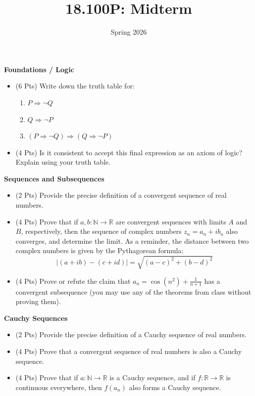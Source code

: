 \documentclass{article}
\title{18.100P: Midterm}
\date{Spring 2026}
\begin{document}
    \maketitle
    \textbf{Foundations / Logic}
    \begin{itemize}
        \item (6 Pts)
            Write down the truth table for:
            \begin{enumerate}
                \item
                    $P\Rightarrow\neg{Q}$
                \item
                    $Q\Rightarrow\neg{P}$
                \item
                    $(P\Rightarrow\neg{Q})\Rightarrow(Q\Rightarrow\neg{P})$
            \end{enumerate}
        \item (4 Pts)
            Is it consistent to accept this final expression
            as an axiom of logic? Explain using your truth table.
    \end{itemize}
    \newpage
    \textbf{Sequences and Subsequences}
    \begin{itemize}
        \item
            (2 Pts)
            Provide the precise definition of a convergent sequence of real
            numbers.
        \item
            (4 Pts)
            Prove that if $a,b:\mathbb{N}\rightarrow\mathbb{R}$ are
            convergent sequences with limits $A$ and $B$, respectively,
            then the sequence of complex numbers
            $z_{n}=a_{n}+ib_{n}$ also converges, and determine the limit.
            As a reminder, the distance between two complex numbers is given
            by the Pythagorean formula:
            \begin{equation}
                |(a+ib)-(c+id)|
                =
                \sqrt{(a-c)^{2}+(b-d)^{2}}
            \end{equation}
        \item
            (4 Pts)
            Prove or refute the claim that
            $a_{n}=\cos(n^{2})+\frac{1}{n+1}$ has a convergent subsequence
            (you may use any of the theorems from class without proving them).
    \end{itemize}
    \newpage
    \textbf{Cauchy Sequences}
    \begin{itemize}
        \item
            (2 Pts)
            Provide the precise definition of a Cauchy sequence of real numbers.
        \item
            (4 Pts)
            Prove that a convergent sequence of real numbers is also a
            Cauchy sequence.
        \item
            (4 Pts)
            Prove that if $a:\mathbb{N}\rightarrow\mathbb{R}$ is a Cauchy
            sequence, and if $f:\mathbb{R}\rightarrow\mathbb{R}$ is continuous
            everywhere, then $f(a_{n})$ also forms a Cauchy sequence.
    \end{itemize}
\end{document}
